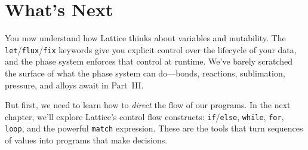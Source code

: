 \section*{What's Next}\label{sec:ch04-whats-next}

You now understand how Lattice thinks about variables and mutability.
The \lstinline|let|/\lstinline|flux|/\lstinline|fix| keywords give you explicit control over the lifecycle of your data, and the phase system enforces that control at runtime.
We've barely scratched the surface of what the phase system can do---bonds, reactions, sublimation, pressure, and alloys await in Part~III\@.

But first, we need to learn how to \emph{direct} the flow of our programs.
In the next chapter, we'll explore Lattice's control flow constructs: \lstinline|if|/\lstinline|else|, \lstinline|while|, \lstinline|for|, \lstinline|loop|, and the powerful \lstinline|match| expression.
These are the tools that turn sequences of values into programs that make decisions.
